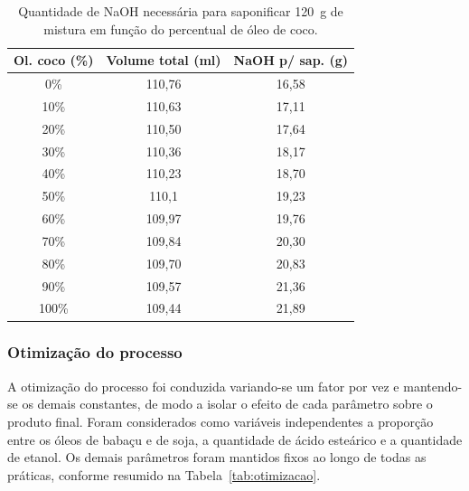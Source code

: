 \begin{table}[H]
    \centering
    \footnotesize
    \caption{Quantidade de NaOH necessária para saponificar 120~g de mistura em função do percentual de óleo de coco.}
    \label{tab:naoh_proporcao}
    \begin{tabular}{ccc}
        \toprule
        \textbf{Ol. coco (\%)} & \textbf{Volume total (ml)} & \textbf{NaOH p/ sap. (g)} \\
        \midrule
        0\%   & 110,76 & 16,58 \\
        10\%  & 110,63 & 17,11 \\
        20\%  & 110,50 & 17,64 \\
        30\%  & 110,36 & 18,17 \\
        40\%  & 110,23 & 18,70 \\
        50\%  & 110,1  & 19,23 \\
        60\%  & 109,97 & 19,76 \\
        70\%  & 109,84 & 20,30 \\
        80\%  & 109,70 & 20,83 \\
        90\%  & 109,57 & 21,36 \\
        100\% & 109,44 & 21,89 \\
        \bottomrule
    \end{tabular}
\end{table}

\subsubsection{Otimização do processo}

A otimização do processo foi conduzida variando-se um fator por vez e mantendo-se os demais constantes, de modo a isolar o efeito de cada parâmetro sobre o produto final. Foram considerados como variáveis independentes a proporção entre os óleos de babaçu e de soja, a quantidade de ácido esteárico e a quantidade de etanol. Os demais parâmetros foram mantidos fixos ao longo de todas as práticas, conforme resumido na Tabela~\ref{tab:otimizacao}.

